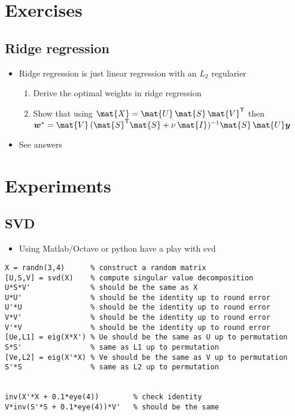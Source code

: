 \documentclass[11pt]{article}
\newcommand{\tr}{\textsf{T}}
\begin{document}
\section{Exercises}
\label{sec:orgc645561}

\subsection{Ridge regression}
\label{sec:org377101d}
\begin{itemize}
\item Ridge regression is just linear regression with an \(L_2\) regularier
\begin{enumerate}
\item Derive the optimal weights in ridge regression
\item Show that using \(\mat{X} = \mat{U}\,\mat{S}\,\mat{V}^\tr\) then
\(\bm{w}^* = \mat{V}\,(\mat{S}^\tr\mat{S} +
        \nu\,\mat{I})^{-1}\mat{S}\,\mat{U}\bm{y}\)
\end{enumerate}
\item See answers
\end{itemize}

\section{Experiments}
\label{sec:orgd8d0862}

\subsection{SVD}
\label{sec:orgfb0e5a4}
\begin{itemize}
\item Using Matlab/Octave or python have a play with svd
\end{itemize}
\begin{verbatim}
X = randn(3,4)      % construct a random matrix
[U,S,V] = svd(X)    % compute singular value decomposition
U*S*V'              % should be the same as X
U*U'                % should be the identity up to round error
U'*U                % should be the identity up to round error
V*V'                % should be the identity up to round error
V'*V                % should be the identity up to round error
[Ue,L1] = eig(X*X') % Ue should be the same as U up to permutation
S*S'                % same as L1 up to permutation
[Ve,L2] = eig(X'*X) % Ve should be the same as V up to permutation
S'*S                % same as L2 up to permutation


inv(X'*X + 0.1*eye(4))        % check identity
V*inv(S'*S + 0.1*eye(4))*V'   % should be the same
\end{verbatim}
\end{document}
